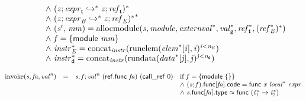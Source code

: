 $$\begin{array}{@{}lcl@{}l@{}}
 &&&\quad {\land}~({\mathit{z}} ; {\mathit{expr}}_{{\mathsf{t}}} \hookrightarrow^\ast {\mathit{z}} ; {\mathit{ref}}_{{\mathsf{t}}})^\ast \\
 &&&\quad {\land}~{({\mathit{z}} ; {\mathit{expr}}_{{\mathit{E}}} \hookrightarrow^\ast {\mathit{z}} ; {\mathit{ref}}_{{\mathit{E}}})^\ast}^\ast \\
 &&&\quad {\land}~({\mathit{s}'},\, {\mathit{mm}}) = {\mathrm{allocmodule}}({\mathit{s}}, {\mathit{module}}, {{\mathit{externval}}^\ast}, {{\mathit{val}}_{{\mathsf{g}}}^\ast}, {{\mathit{ref}}_{{\mathsf{t}}}^\ast}, {({{\mathit{ref}}_{{\mathit{E}}}^\ast})^\ast}) \\
 &&&\quad {\land}~{\mathit{f}} = \{ \begin{array}[t]{@{}l@{}}
\mathsf{module}~{\mathit{mm}} \}\end{array} \\
 &&&\quad {\land}~{{\mathit{instr}}_{{\mathit{E}}}^\ast} = {{\mathrm{concat}}}_{{\mathit{instr}}}({{\mathrm{runelem}}({{\mathit{elem}}^\ast}[{\mathit{i}}], {\mathit{i}})^{{\mathit{i}}<{\mathit{n}}_{{\mathit{E}}}}}) \\
 &&&\quad {\land}~{{\mathit{instr}}_{{\mathsf{d}}}^\ast} = {{\mathrm{concat}}}_{{\mathit{instr}}}({{\mathrm{rundata}}({{\mathit{data}}^\ast}[{\mathit{j}}], {\mathit{j}})^{{\mathit{j}}<{\mathit{n}}_{{\mathsf{d}}}}}) \\
\end{array}
$$

\vspace{1ex}

$$
\begin{array}{@{}lcl@{}l@{}}
{\mathrm{invoke}}({\mathit{s}}, {\mathit{fa}}, {{\mathit{val}}^{{\mathit{n}}}}) &=& {\mathit{s}} ; {\mathit{f}} ; {{\mathit{val}}^{{\mathit{n}}}}~(\mathsf{ref.func}~{\mathit{fa}})~(\mathsf{call\_ref}~0) &\quad
  \mbox{if}~{\mathit{f}} = \{ \begin{array}[t]{@{}l@{}}
\mathsf{module}~\{ \begin{array}[t]{@{}l@{}}
 \}\end{array} \}\end{array} \\
 &&&\quad {\land}~({\mathit{s}} ; {\mathit{f}}).\mathsf{func}[{\mathit{fa}}].\mathsf{code} = \mathsf{func}~{\mathit{x}}~{{\mathit{local}}^\ast}~{\mathit{expr}} \\
 &&&\quad {\land}~{\mathit{s}}.\mathsf{func}[{\mathit{fa}}].\mathsf{type} \approx \mathsf{func}~({{\mathit{t}}_{{1}}^{{\mathit{n}}}} \rightarrow {{\mathit{t}}_{{2}}^\ast}) \\
\end{array}
$$

